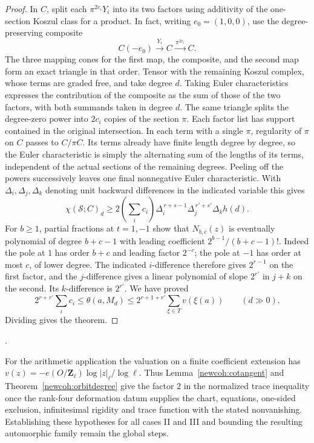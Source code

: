 \begin{proof}
In \(C\), split each \(\pi^{2c_i}Y_i\) into its two factors using
additivity of the one-section Koszul class for a product. In fact,
writing \(e_0=(1,0,0)\), use the degree-preserving composite
\[
 C(-e_0)\xrightarrow{\,Y_i\,}C\xrightarrow{\,\pi^{2c_i}\,} C .
\]
The three mapping cones for the first map, the composite, and the
second map form an exact triangle in that order. Tensor with the
remaining Koszul complex, whose terms are graded free, and take
degree \(d\). Taking Euler characteristics expresses the contribution
of the composite as the sum of those of the two factors, with
both summands taken in degree \(d\). The same triangle splits the
degree-zero power into \(2c_i\) copies of the section \(\pi\).
Each factor list has support contained in
the original intersection. In each term with a single \(\pi\),
regularity of \(\pi\) on \(C\) passes to \(C/\pi C\).
Its terms already have finite length degree by degree, so the Euler
characteristic is simply the alternating sum of the lengths of its
terms, independent of the actual sections of the remaining degrees.
Peeling off the powers successively leaves one final nonnegative
Euler characteristic. With \(\Delta_i,\Delta_j,\Delta_k\) denoting
unit backward differences in the indicated variable this gives
\[
 \chi(\mathcal S;C)_d\ge
 2\left(\sum_i c_i\right)
 \Delta_i^{\,r+s-1}\Delta_j^{\,r'+s'}\Delta_k h(d).
\]
For \(b\ge1\), partial fractions at \(t=1,-1\) show that
\(N_{b,c}(z)\) is eventually polynomial of degree \(b+c-1\)
with leading coefficient \(2^{b-1}/(b+c-1)!\). Indeed the pole
at \(1\) has order \(b+c\) and leading factor \(2^{-c}\);
the pole at \(-1\) has order at most \(c\), of lower degree.
The indicated \(i\)-difference therefore gives \(2^{r-1}\) on
the first factor, and the \(j\)-difference gives a linear polynomial
of slope \(2^{r'}\) in \(j+k\) on the second. Its \(k\)-difference
is \(2^{r'}\). We have proved
\[
 2^{r+r'}\sum_i c_i\le \theta(a,M_d)
 \le 2^{r+1+r'}\sum_{\xi\in T}v(\xi(a))
 \qquad(d\gg0).
\]
Dividing gives the theorem.
\end{proof}
.

For the arithmetic application the valuation on a finite coefficient
extension has \(v(z)=-e(O/\mathbf Z_\ell)\log|z|_\ell/\log\ell\).
Thus Lemma~\ref{newcoh:cotangent} and Theorem~\ref{newcoh:orbitdegree}
give the factor \(2\) in the normalized trace inequality once the
rank-four deformation datum supplies the chart, equations, one-sided
exclusion, infinitesimal rigidity and trace function with the stated
nonvanishing. Establishing these hypotheses for all cases II and III
and bounding the resulting automorphic family remain the global steps.
 
